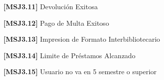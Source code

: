 	\begin{Citemize}
	\item {\bf [MSJ3.11]} Devolución Exitosa
	\end{Citemize}
	
	\begin{Citemize}
	\item {\bf [MSJ3.12]} Pago de Multa Exitoso
	\end{Citemize}
	
	\begin{Citemize}
	\item {\bf [MSJ3.13]} Impresion de Formato Interbibliotecario
	\end{Citemize}
	
	\begin{Citemize}
	\item {\bf [MSJ3.14]} Limite de Préstamos Alcanzado
	\end{Citemize}
	
	\begin{Citemize}
	\item {\bf [MSJ3.15]} Usuario no va en 5 semestre o superior
	\end{Citemize}
